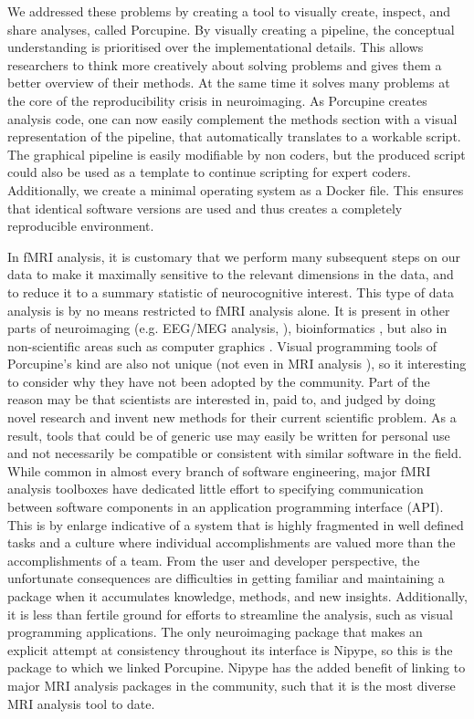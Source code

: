 We addressed these problems by creating a tool to visually create, inspect, and share analyses, called Porcupine. By visually creating a pipeline, the conceptual understanding is prioritised over the implementational details. This allows researchers to think more creatively about solving problems and gives them a better overview of their methods. At the same time it solves many problems at the core of the reproducibility crisis in neuroimaging. As Porcupine creates analysis code, one can now easily complement the methods section with a visual representation of the pipeline, that automatically translates to a workable script. The graphical pipeline is easily modifiable by non coders, but the produced script could also be used as a template to continue scripting for expert coders. Additionally, we create a minimal operating system as a Docker file. This ensures that identical software versions are used and thus creates a completely reproducible environment.

In fMRI analysis, it is customary that we perform many subsequent steps on our data to make it maximally sensitive to the relevant dimensions in the data, and to reduce it to a summary statistic of neurocognitive interest. This type of data analysis is by no means restricted to fMRI analysis alone. It is present in other parts of neuroimaging (e.g. EEG/MEG analysis, \cite{Oostenveld2011}), bioinformatics \cite{Wolstencroft2013}, but also in non-scientific areas such as computer graphics \cite{Blender}. Visual programming tools of Porcupine's kind are also not unique (not even in MRI analysis \cite{Lucas2010}), so it interesting to consider why they have not been adopted by the community. Part of the reason may be that scientists are interested in, paid to, and judged by doing novel research and invent new methods for their current scientific problem. As a result, tools that could be of generic use may easily be written for personal use and not necessarily be compatible or consistent with similar software in the field. While common in almost every branch of software engineering, major fMRI analysis toolboxes have dedicated little effort to specifying communication between software components in an application programming interface (API). This is by enlarge indicative of a system that is highly fragmented in well defined tasks and a culture where individual accomplishments are valued more than the accomplishments of a team. From the user and developer perspective, the unfortunate consequences are difficulties in getting familiar and maintaining a package when it accumulates knowledge, methods, and new insights. Additionally, it is less than fertile ground for efforts to streamline the analysis, such as visual programming applications. The only neuroimaging package that makes an explicit attempt at consistency throughout its interface is Nipype, so this is the package to which we linked Porcupine. Nipype has the added benefit of linking to major MRI analysis packages in the community, such that it is the most diverse MRI analysis tool to date. 

